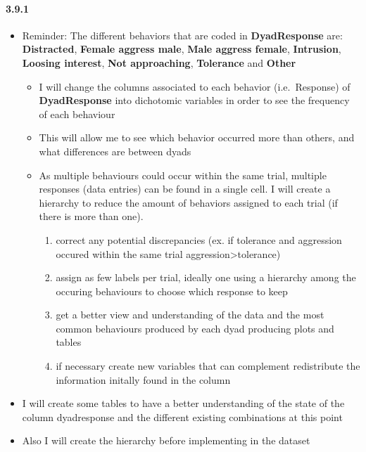 \documentclass[
]{article}
\providecommand{\tightlist}{%
  \setlength{\itemsep}{0pt}\setlength{\parskip}{0pt}}
\begin{document}
\hypertarget{section}{%
\paragraph{3.9.1}\label{section}}

\begin{itemize}
\item
  Reminder: The different behaviors that are coded in
  \textbf{DyadResponse} are: \textbf{Distracted}, \textbf{Female aggress
  male}, \textbf{Male aggress female}, \textbf{Intrusion},
  \textbf{Loosing interest}, \textbf{Not approaching},
  \textbf{Tolerance} and \textbf{Other}

  \begin{itemize}
  \tightlist
  \item
    I will change the columns associated to each behavior
    (i.e.~Response) of \textbf{DyadResponse} into dichotomic variables
    in order to see the frequency of each behaviour
  \item
    This will allow me to see which behavior occurred more than others,
    and what differences are between dyads
  \item
    As multiple behaviours could occur within the same trial, multiple
    responses (data entries) can be found in a single cell. I will
    create a hierarchy to reduce the amount of behaviors assigned to
    each trial (if there is more than one).

    \begin{enumerate}
    \def\labelenumi{\arabic{enumi}.}
    \tightlist
    \item
      correct any potential discrepancies (ex. if tolerance and
      aggression occured within the same trial
      aggression\textgreater tolerance)
    \item
      assign as few labels per trial, ideally one using a hierarchy
      among the occuring behaviours to choose which response to keep
    \item
      get a better view and understanding of the data and the most
      common behaviours produced by each dyad producing plots and tables
    \item
      if necessary create new variables that can complement redistribute
      the information initally found in the column
    \end{enumerate}
  \end{itemize}
\item
  I will create some tables to have a better understanding of the state
  of the column dyadresponse and the different existing combinations at
  this point
\item
  Also I will create the hierarchy before implementing in the dataset
\end{itemize}
\end{document}
